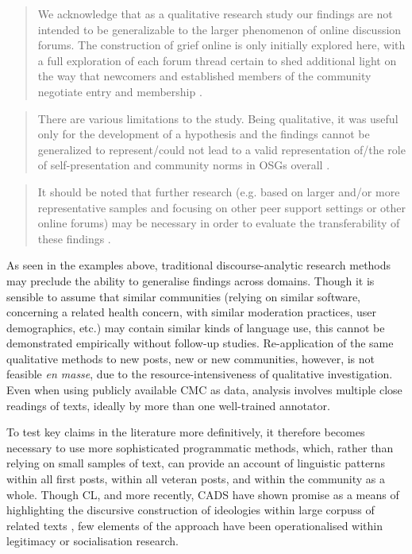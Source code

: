 \begin{quote}\singlespacing\small
We acknowledge that as a qualitative research study our findings are not intended to be generalizable to the larger phenomenon of online discussion forums. The construction of grief online is only initially explored here, with a full exploration of each forum thread certain to shed additional light on the way that newcomers and established \glspl{member} of the community negotiate entry and membership \cite[p.~8]{varga2014grieving}.
\end{quote}

\begin{quote}\singlespacing\small
There are various limitations to the study. Being qualitative, it was useful only for the development of a hypothesis and the findings cannot be generalized to represent\slash could not lead to a valid representation of\slash the role of self-presentation and community norms in OSGs overall \cite[p.~8]{stommel_use_2011}.
\end{quote}

\begin{quote}\small\singlespacing
It should be noted that further research (e.g. based on larger and\slash or more representative samples and focusing on other peer support settings or other online forums) may be necessary in order to evaluate the transferability of these findings \textcite[p.~14]{kaufman2016producing}.
\end{quote}
%
As seen in the examples above, traditional discourse\hyp{}analytic research methods may preclude the ability to generalise findings across domains. Though it is sensible to assume that similar communities (relying on similar software, concerning a related health concern, with similar moderation practices, user demographics, etc.) may contain similar kinds of language use, this cannot be demonstrated empirically without follow\hyp{}up studies. Re\hyp{}application of the same qualitative methods to new \glspl{post}, new  or new communities, however, is not feasible \emph{en masse}, due to the resource\hyp{}intensiveness of qualitative investigation. Even when using publicly available \gls{CMC} as data, analysis involves multiple close readings of texts, ideally by more than one well\hyp{}trained annotator. 

To test key claims in the literature more definitively, it therefore becomes necessary to use more sophisticated programmatic methods, which, rather than relying on small samples of text, can provide an account of linguistic patterns within all first \glspl{post}, within all veteran \glspl{post}, and within the community as a whole. Though \gls{CL}, and more recently, \gls{CADS} have shown promise as a means of highlighting the discursive construction of ideologies within large \glspl{corpus} of related texts \cite[e.g.][]{koteyko_climate_2013,salama_ideological_2011}, few elements of the approach have been operationalised within legitimacy or socialisation research.

